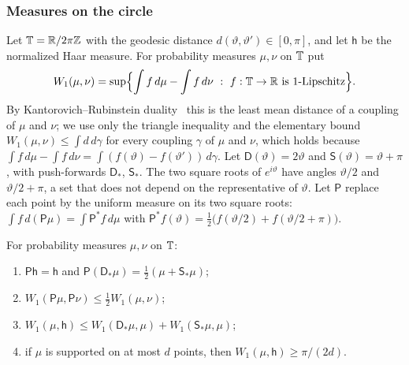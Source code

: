 \subsubsection*{Measures on the circle}

Let $\mathbb T=\mathbb R/2\pi\mathbb Z$ with the geodesic distance $d(\vartheta,\vartheta')\in[0,\pi]$, and let $\mathsf h$ be the normalized Haar measure. For
probability measures $\mu,\nu$ on $\mathbb T$ put
\[
W_1(\mu,\nu)=\sup\Bigl\{\int f\,d\mu-\int f\,d\nu\ :\ f:\mathbb T\to\mathbb R\text{ is $1$-Lipschitz}\Bigr\}.
\]
By Kantorovich--Rubinstein duality~\cite[Chapter~5]{Vil09} this is the least mean distance of a coupling of $\mu$ and $\nu$; we use only
the triangle inequality and the elementary bound $W_1(\mu,\nu)\le\int d\,d\gamma$ for every coupling $\gamma$ of $\mu$ and $\nu$, which
holds because $\int f\,d\mu-\int f\,d\nu=\int(f(\vartheta)-f(\vartheta'))\,d\gamma$. Let $\mathsf D(\vartheta)=2\vartheta$ and
$\mathsf S(\vartheta)=\vartheta+\pi$, with push-forwards $\mathsf D_*$, $\mathsf S_*$. The two square roots of $e^{i\vartheta}$ have angles
$\vartheta/2$ and $\vartheta/2+\pi$, a set that does not depend on the representative of $\vartheta$. Let $\mathsf P$ replace each point by
the uniform measure on its two square roots: $\int f\,d(\mathsf P\mu)=\int\mathsf P^*f\,d\mu$ with
$\mathsf P^*f(\vartheta)=\frac12\bigl(f(\vartheta/2)+f(\vartheta/2+\pi)\bigr)$.

\begin{lemma}\label{lem:circle}
For probability measures $\mu,\nu$ on $\mathbb T$:
\begin{enumerate}[label=(\alph*),itemsep=1pt]
\item $\mathsf P\mathsf h=\mathsf h$ and $\mathsf P(\mathsf D_*\mu)=\frac12(\mu+\mathsf S_*\mu)$;
\item $W_1(\mathsf P\mu,\mathsf P\nu)\le\frac12W_1(\mu,\nu)$;
\item $W_1(\mu,\mathsf h)\le W_1(\mathsf D_*\mu,\mu)+W_1(\mathsf S_*\mu,\mu)$;
\item if $\mu$ is supported on at most $d$ points, then $W_1(\mu,\mathsf h)\ge\pi/(2d)$.
\end{enumerate}
\end{lemma}

